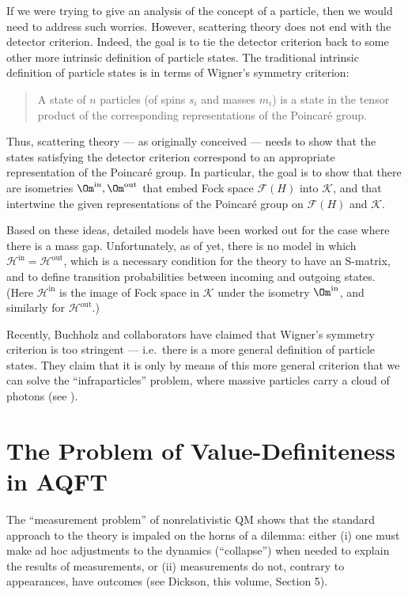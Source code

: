 \documentclass[12pt]{article}
\theoremstyle{definition}
\theoremstyle{definition}
\theoremstyle{remark}
\def\2#1{{\mathcal #1}}
\begin{document}
If we were trying to give an analysis of the concept of a particle,
then we would need to address such worries.  However, scattering
theory does not end with the detector criterion.  Indeed, the goal is
to tie the detector criterion back to some other more intrinsic
definition of particle states.  The traditional intrinsic definition
of particle states is in terms of Wigner's symmetry criterion:
\begin{quote} A state of $n$ particles (of spins $s_i$
  and masses $m_i$) is a state in the tensor product of
  the corresponding representations of the Poincar{\'e}
  group.  \end{quote} Thus, scattering theory --- as
originally conceived --- needs to show that the states
satisfying the detector criterion correspond to an
appropriate representation of the Poincar{\'e} group.
In particular, the goal is to show that there are
isometries $\Om ^{\mathrm{in}},\Om ^{\mathrm{out}}$
that embed Fock space $\2F (H)$ into $\2K$, and that
intertwine the given representations of the
Poincar{\'e} group on $\2F (H)$ and $\2K$.

Based on these ideas, detailed models have been worked
out for the case where there is a mass gap.
Unfortunately, as of yet, there is no model in which
$\2H ^{\mathrm{in}}=\2H ^{\mathrm{out}}$, which is a
necessary condition for the theory to have an S-matrix,
and to define transition probabilities between incoming
and outgoing states.  (Here $\2H ^{\mathrm{in}}$ is the
image of Fock space in $\2K$ under the isometry $\Om
^{\mathrm{in}}$, and similarly for $\2H
^{\mathrm{out}}$.)

Recently, Buchholz and collaborators have claimed that Wigner's
symmetry criterion is too stringent --- i.e.\ there is a more general
definition of particle states.  They claim that it is only by means of
this more general criterion that we can solve the ``infraparticles''
problem, where massive particles carry a cloud of photons (see
\cite{buc-por}).


\bigskip {}


\section{The Problem of Value-Definiteness in AQFT} \label{modal}

The ``measurement problem'' of nonrelativistic QM shows that the
standard approach to the theory is impaled on the horns of a dilemma:
either (i) one must make ad hoc adjustments to the dynamics
(``collapse'') when needed to explain the results of measurements, or
(ii) measurements do not, contrary to appearances, have outcomes (see
Dickson, this volume, Section 5).
\end{document}
